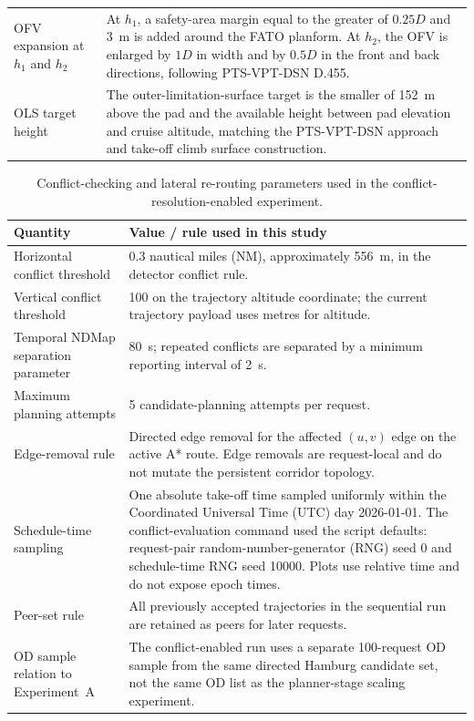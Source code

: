 \begin{table}[H]
\begin{tabularx}{\textwidth}{lX}
        OFV expansion at \(h_1\) and \(h_2\) & At \(h_1\), a safety-area margin equal to the greater of \(0.25D\) and \SI{3}{m} is added around the FATO planform. At \(h_2\), the OFV is enlarged by \(1D\) in width and by \(0.5D\) in the front and back directions, following PTS-VPT-DSN D.455. \\
        OLS target height & The outer-limitation-surface target is the smaller of \SI{152}{m} above the pad and the available height between pad elevation and cruise altitude, matching the PTS-VPT-DSN approach and take-off climb surface construction. \\
        \bottomrule
    \end{tabularx}
\end{table}

\begin{table}[H]
    \centering
    \caption{Conflict-checking and lateral re-routing parameters used in the conflict-resolution-enabled experiment.}
    \label{tab:deconfliction_params}
    \small
    \begin{tabularx}{\textwidth}{lX}
        \toprule
        Quantity & Value / rule used in this study \\
        \midrule
        Horizontal conflict threshold & 0.3 nautical miles (NM), approximately \SI{556}{m}, in the detector conflict rule. \\
        Vertical conflict threshold & 100 on the trajectory altitude coordinate; the current trajectory payload uses metres for altitude. \\
        Temporal NDMap separation parameter & \SI{80}{s}; repeated conflicts are separated by a minimum reporting interval of \SI{2}{s}. \\
        Maximum planning attempts & 5 candidate-planning attempts per request. \\
        Edge-removal rule & Directed edge removal for the affected \((u,v)\) edge on the active A* route. Edge removals are request-local and do not mutate the persistent corridor topology. \\
        Schedule-time sampling & One absolute take-off time sampled uniformly within the Coordinated Universal Time (UTC) day 2026-01-01. The conflict-evaluation command used the script defaults: request-pair random-number-generator (RNG) seed 0 and schedule-time RNG seed 10000. Plots use relative time and do not expose epoch times. \\
        Peer-set rule & All previously accepted trajectories in the sequential run are retained as peers for later requests. \\
        OD sample relation to Experiment~A & The conflict-enabled run uses a separate 100-request OD sample from the same directed Hamburg candidate set, not the same OD list as the planner-stage scaling experiment. \\
        \bottomrule
    \end{tabularx}
\end{table}

